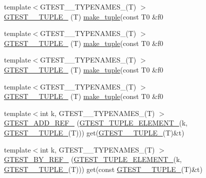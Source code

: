 \begin{DoxyCompactItemize}
\item 
{\footnotesize template$<$G\+T\+E\+S\+T\+\_\+\_\+\+T\+Y\+P\+E\+N\+A\+M\+E\+S\+\_\+(\+T) $>$ }\\\hyperlink{namespacestd_1_1tr1_a61277f5af24b20fce87a9fd94307ab34}{G\+T\+E\+S\+T\+\_\+\_\+\+T\+U\+P\+L\+E\+\_\+} (T) \hyperlink{namespacestd_1_1tr1_af7e12a0f5b5791b5b7c49a5a17b85359}{make\+\_\+tuple}(const T0 \&f0
\item 
{\footnotesize template$<$G\+T\+E\+S\+T\+\_\+\_\+\+T\+Y\+P\+E\+N\+A\+M\+E\+S\+\_\+(\+T) $>$ }\\\hyperlink{namespacestd_1_1tr1_a29c8efcb79a4749e079b704c418266e6}{G\+T\+E\+S\+T\+\_\+\_\+\+T\+U\+P\+L\+E\+\_\+} (T) \hyperlink{namespacestd_1_1tr1_af7e12a0f5b5791b5b7c49a5a17b85359}{make\+\_\+tuple}(const T0 \&f0
\item 
{\footnotesize template$<$G\+T\+E\+S\+T\+\_\+\_\+\+T\+Y\+P\+E\+N\+A\+M\+E\+S\+\_\+(\+T) $>$ }\\\hyperlink{namespacestd_1_1tr1_a6afad1f98814ccc897d0b02bc6fc4e7d}{G\+T\+E\+S\+T\+\_\+\_\+\+T\+U\+P\+L\+E\+\_\+} (T) \hyperlink{namespacestd_1_1tr1_af7e12a0f5b5791b5b7c49a5a17b85359}{make\+\_\+tuple}(const T0 \&f0
\item 
{\footnotesize template$<$G\+T\+E\+S\+T\+\_\+\_\+\+T\+Y\+P\+E\+N\+A\+M\+E\+S\+\_\+(\+T) $>$ }\\\hyperlink{namespacestd_1_1tr1_aa636d3269bf1f368a7bc09ff158bc482}{G\+T\+E\+S\+T\+\_\+\_\+\+T\+U\+P\+L\+E\+\_\+} (T) \hyperlink{namespacestd_1_1tr1_af7e12a0f5b5791b5b7c49a5a17b85359}{make\+\_\+tuple}(const T0 \&f0
\item 
{\footnotesize template$<$int k, G\+T\+E\+S\+T\+\_\+\_\+\+T\+Y\+P\+E\+N\+A\+M\+E\+S\+\_\+(\+T) $>$ }\\\hyperlink{namespacestd_1_1tr1_ad0769041710d18b917067576f84b0303}{G\+T\+E\+S\+T\+\_\+\+A\+D\+D\+\_\+\+R\+E\+F\+\_\+} (\hyperlink{gtest-tuple_8h_a1b7f133d8aa02e0b7afed7b66781eeb7}{G\+T\+E\+S\+T\+\_\+\+T\+U\+P\+L\+E\+\_\+\+E\+L\+E\+M\+E\+N\+T\+\_\+}(k, \hyperlink{namespacestd_1_1tr1_aa636d3269bf1f368a7bc09ff158bc482}{G\+T\+E\+S\+T\+\_\+\_\+\+T\+U\+P\+L\+E\+\_\+}(T))) get(\hyperlink{namespacestd_1_1tr1_aa636d3269bf1f368a7bc09ff158bc482}{G\+T\+E\+S\+T\+\_\+\_\+\+T\+U\+P\+L\+E\+\_\+}(T)\&t)
\item 
{\footnotesize template$<$int k, G\+T\+E\+S\+T\+\_\+\_\+\+T\+Y\+P\+E\+N\+A\+M\+E\+S\+\_\+(\+T) $>$ }\\\hyperlink{namespacestd_1_1tr1_a7c131d0c2462612a78012be16114f61d}{G\+T\+E\+S\+T\+\_\+\+B\+Y\+\_\+\+R\+E\+F\+\_\+} (\hyperlink{gtest-tuple_8h_a1b7f133d8aa02e0b7afed7b66781eeb7}{G\+T\+E\+S\+T\+\_\+\+T\+U\+P\+L\+E\+\_\+\+E\+L\+E\+M\+E\+N\+T\+\_\+}(k, \hyperlink{namespacestd_1_1tr1_aa636d3269bf1f368a7bc09ff158bc482}{G\+T\+E\+S\+T\+\_\+\_\+\+T\+U\+P\+L\+E\+\_\+}(T))) get(const \hyperlink{namespacestd_1_1tr1_aa636d3269bf1f368a7bc09ff158bc482}{G\+T\+E\+S\+T\+\_\+\_\+\+T\+U\+P\+L\+E\+\_\+}(T)\&t)

\end{DoxyCompactItemize}
